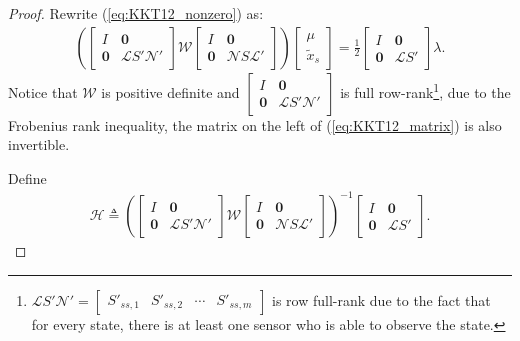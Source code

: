 \documentclass[12pt]{article}
\newcommand{\Nc}{{\mathcal{N}}}
\newcommand{\Wc}{{\mathcal{W}}}
\newcommand{\Lc}{{\mathcal{L}}}
\newcommand{\Hc}{{\mathcal{H}}}
\newtheorem*{proof}{\textbf{Proof}}
\begin{document}
\begin{proof}
Rewrite (\ref{eq:KKT12_nonzero}) as:
\begin{align}\label{eq:KKT12_matrix}
\left(
\begin{bmatrix}
I & \mathbf{0} \\
\mathbf{0}  &  \Lc S{'} \Nc{'}
\end{bmatrix}
\Wc
\begin{bmatrix}
I & \mathbf{0} \\
\mathbf{0}  &  \Nc S \Lc{'}
\end{bmatrix}
\right)
\begin{bmatrix}
\mu \\ \tilde{x}_s
\end{bmatrix}=\frac{1}{2}
\begin{bmatrix}
I & \mathbf{0} \\
\mathbf{0}  &  \Lc S{'}
\end{bmatrix}
\lambda .
\end{align}
Notice that $\Wc$ is positive definite and $\begin{bmatrix}
	I & \mathbf{0} \\
	\mathbf{0}  &  \Lc S{'} \Nc{'}
\end{bmatrix}$
is full row-rank\footnote{
$\Lc S{'} \Nc{'}=
\begin{bmatrix}
	S{'}_{ss,1} & S{'}_{ss,2} & \cdots & S{'}_{ss,m}
\end{bmatrix}
$ is row full-rank due to the fact that for every state, there is at least one sensor who is able to observe the state.
}, 
due to the Frobenius rank inequality, the matrix on the left of (\ref{eq:KKT12_matrix}) is also invertible.

Define
\begin{align}\label{eq:def_H}
\Hc	\triangleq
\left(
\begin{bmatrix}
I & \mathbf{0} \\
\mathbf{0}  &  \Lc S{'} \Nc{'}
\end{bmatrix}
\Wc
\begin{bmatrix}
I & \mathbf{0} \\
\mathbf{0}  &  \Nc S \Lc{'}
\end{bmatrix}
\right)^{-1}
\begin{bmatrix}
	I & \mathbf{0} \\ \mathbf{0} &\Lc S{'}
\end{bmatrix}.
\end{align}


\end{proof}
\end{document}
